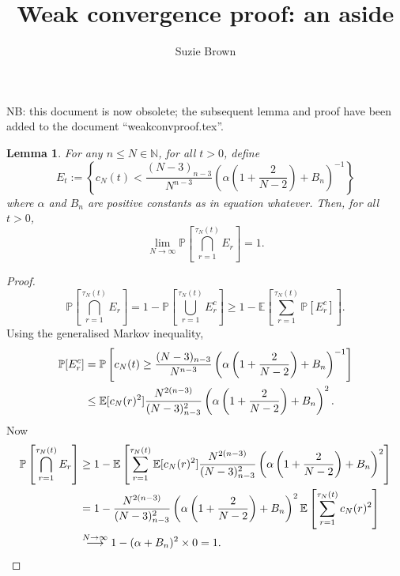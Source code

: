 \documentclass{article}
\title{Weak convergence proof: an aside}
\author{Suzie Brown}
\newtheorem{lemma}{Lemma}
\newcommand{\Prob}{\mathbb{P}}
\newcommand{\E}{\mathbb{E}}
\newcommand{\1}[1]{\mathbb{I}_{#1}}
\begin{document}
\maketitle
\thispagestyle{fancy}

NB: this document is now obsolete; the subsequent lemma and proof have been added to the document ``weakconvproof.tex''.\\

\begin{lemma}
For any $n \leq N \in \mathbb{N}$, for all $t>0$, define 
\begin{equation}
E_t := \left\{ c_N(t) < \frac{(N-3)_{n-3}}{N^{n-3}} \left( \alpha \left(1 + \frac{2}{N-2} \right) + B_n \right)^{-1} \right\} 
\end{equation}
where $\alpha$ and $B_n$ are positive constants as in equation whatever.
Then, for all $t>0$,
\begin{equation}
\lim_{N\to\infty} \Prob \left[  \bigcap_{r=1}^{\tau_N(t)} E_r \right] = 1 .
\end{equation}
\end{lemma}

\begin{proof}
\begin{equation}
\Prob \left[  \bigcap_{r=1}^{\tau_N(t)} E_r \right]
= 1 - \Prob \left[  \bigcup_{r=1}^{\tau_N(t)} E_r^c \right]
\geq 1 - \E \left[ \sum_{r=1}^{\tau_N(t)} \Prob [E_r^c] \right] .
\end{equation}
Using the generalised Markov inequality,
\begin{align}
\Prob [E_r^c] &= \Prob \left[ c_N(t) \geq \frac{(N-3)_{n-3}}{N^{n-3}} \left( \alpha \left(1 + \frac{2}{N-2} \right) + B_n \right)^{-1} \right] \notag\\
&\leq \E[c_N(r)^2] \frac{N^{2(n-3)}}{(N-3)_{n-3}^2} \left( \alpha \left(1 + \frac{2}{N-2} \right) + B_n \right)^2 .
\end{align}
Now
\begin{align}
\Prob \left[  \bigcap_{r=1}^{\tau_N(t)} E_r \right]
&\geq 1 - \E \left[  \sum_{r=1}^{\tau_N(t)} \E[c_N(r)^2] \frac{N^{2(n-3)}}{(N-3)_{n-3}^2} \left( \alpha \left(1 + \frac{2}{N-2} \right) + B_n \right)^2 \right] \notag\\
&= 1 - \frac{N^{2(n-3)}}{(N-3)_{n-3}^2} \left( \alpha \left(1 + \frac{2}{N-2} \right) + B_n \right)^2 
\E \left[ \sum_{r=1}^{\tau_N(t)} c_N(r)^2 \right] \notag\\
&\overset{N\to\infty}{\longrightarrow} 1 - (\alpha + B_n)^2 \times 0 = 1 .
\end{align}

\end{proof}
\end{document}
